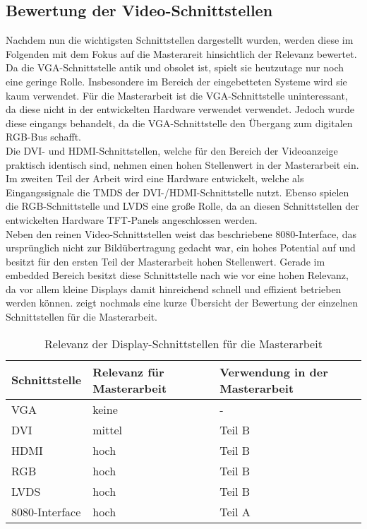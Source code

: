 \subsection{Bewertung der Video-Schnittstellen}
\label{cha:bewertung_video}
Nachdem nun die wichtigsten Schnittstellen dargestellt wurden, werden diese im Folgenden mit dem Fokus auf die Masterareit hinsichtlich der Relevanz bewertet.
Da die VGA-Schnittstelle antik und obsolet ist, spielt sie heutzutage nur noch eine geringe Rolle. Insbesondere im Bereich der eingebetteten Systeme wird sie kaum verwendet. Für die Masterarbeit ist die VGA-Schnittstelle uninteressant, da diese nicht in der entwickelten Hardware verwendet verwendet. Jedoch wurde diese eingangs behandelt, da die VGA-Schnittstelle den Übergang zum digitalen RGB-Bus schafft.\\
Die DVI- und HDMI-Schnittstellen, welche für den Bereich der Videoanzeige praktisch identisch sind, nehmen einen hohen Stellenwert in der Masterarbeit ein. Im zweiten Teil der Arbeit wird eine Hardware entwickelt, welche als Eingangssignale die TMDS der DVI-/HDMI-Schnittstelle nutzt. 
Ebenso spielen die RGB-Schnittstelle und LVDS eine große Rolle, da an diesen Schnittstellen der entwickelten Hardware TFT-Panels angeschlossen werden. \\
Neben den reinen Video-Schnittstellen weist das beschriebene 8080-Interface, das ursprünglich nicht zur Bildübertragung gedacht war, ein hohes Potential auf und besitzt für den ersten Teil der Masterarbeit hohen Stellenwert. Gerade im embedded Bereich besitzt diese Schnittstelle nach wie vor eine hohen Relevanz, da vor allem kleine Displays damit hinreichend schnell und effizient betrieben werden können.  zeigt nochmals eine kurze Übersicht der Bewertung der einzelnen Schnittstellen für die Masterarbeit.

\begin{table}[h]
\begin{tabular}{|p{3cm}|p{5cm}|p{4.5cm}|}\hline
\rowcolor{TableBackgroundColor}
   \textbf{Schnittstelle} 	& \textbf{Relevanz für Masterarbeit} 	& \textbf{Verwendung in der Masterarbeit}	\\ \hline
   VGA 						& keine  								& - 	 									\\ \hline
   DVI 						& mittel 								& Teil B 									\\ \hline
   HDMI						& hoch 									& Teil B 									\\ \hline
   RGB 						& hoch 									& Teil B 									\\ \hline
   LVDS 					& hoch									& Teil B 									\\ \hline
   8080-Interface 			& hoch 									& Teil A 									\\ \hline
\end{tabular}
\caption{Relevanz der Display-Schnittstellen für die Masterarbeit}
\label{tab:interface_vergleich}
\end{table}

